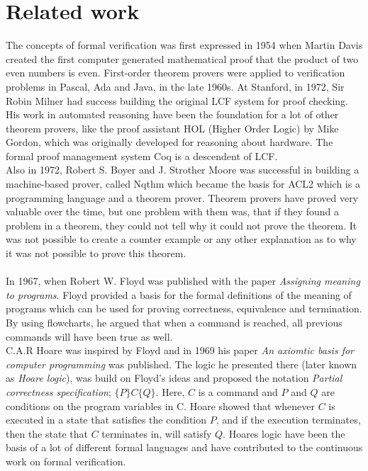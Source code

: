 \documentclass[a4paper]{report}
\begin{document}
\chapter{Related work}
The concepts of formal verification was first expressed in 1954 when Martin Davis created the first computer generated mathematical proof that the product of two even numbers is even. First-order theorem provers were applied to verification problems in Pascal, Ada and Java, in the late 1960s. 
At Stanford, in 1972, Sir Robin Milner had success building the original LCF system for proof checking. His work in automated reasoning have been the foundation for a lot of other theorem provers, like the proof assistant HOL (Higher Order Logic) by Mike Gordon, which was originally developed for reasoning about hardware. The formal proof management system Coq is a descendent of LCF. \\
Also in 1972, Robert S. Boyer and J. Strother Moore was successful in building a machine-based prover, called Nqthm which became the basis for ACL2 which is a programming language and a theorem prover. Theorem provers have proved very valuable over the time, but one problem with them was, that if they found a problem in a theorem, they could not tell why it could not prove the theorem. It was not possible to create a counter example or any other explanation as to why it was not possible to prove this theorem. \\\\
In 1967, when Robert W. Floyd was published with the paper \textit{Assigning meaning to programs}\cite{Floyd1967}. Floyd provided a basis for the formal definitions of the meaning of programs which can be used for proving correctness, equivalence and termination. By using flowcharts, he argued that when a command is reached, all previous commands will have been true as well.\\ C.A.R Hoare was inspired by Floyd and in 1969 his paper \textit{An axiomtic basis for computer programming}\cite{Hoare1969} was published. The logic he presented there (later known as \textit{Hoare logic}), was build on Floyd's ideas and proposed the notation \textit{Partial correctness specification}; $\{P\} C \{Q\}$. Here, $C$ is a command and $P$ and $Q$ are conditions on the program variables in C. Hoare showed that whenever $C$ is executed in a state that satisfies the condition $P$, and if the execution terminates, then the state that $C$ terminates in, will satisfy $Q$. Hoares logic have been the basis of a lot of different formal languages and have contributed to the continuous work on formal verification. \\
\end{document}
